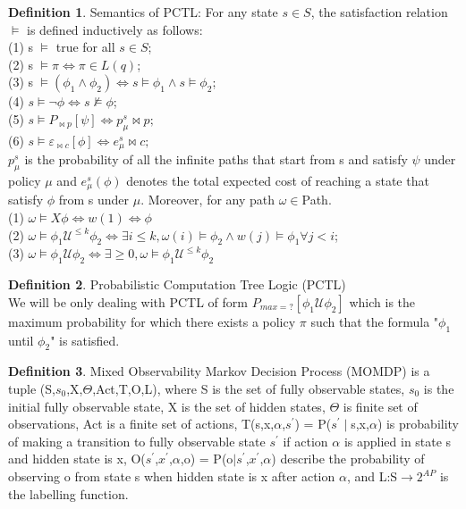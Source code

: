 \documentclass{article}
\theoremstyle{definition}
\newtheorem{definition}{Definition}[section]
\begin{document}
\begin{definition}{Semantics of PCTL:}
For any state $s \in S$, the satisfaction relation $\models$ is defined inductively as follows:\\
(1) s $\models$ true for all $s \in S$;\\
(2) s $\models \pi \Leftrightarrow \pi \in L(q)$;\\
(3) s $\models (\phi_1 \wedge \phi_2) \Leftrightarrow s \models \phi_1 \wedge s \models \phi_2$;\\
(4) $s \models \neg \phi \Leftrightarrow s \not \models \phi$;\\
(5) $s \models P_{\Join p}[\psi] \Leftrightarrow p_\mu^s \Join p;$\\
(6) $s \models \varepsilon_{\Join c}[\phi] \Leftrightarrow e_\mu^s \Join c;$\\

$p_\mu^s$ is the probability of all the infinite paths that start from s and satisfy $\psi$ under policy $\mu$ and $e_\mu^s(\phi)$ denotes the total expected cost of reaching a state that satisfy $\phi$ from s under $\mu$. Moreover, for any path $\omega \in $Path.\\
(1) $\omega \models X \phi \Leftrightarrow w(1) \Leftrightarrow \phi$\\
(2) $\omega \models \phi_1 \mathcal{U}^{\le k} \phi_2 \Leftrightarrow \exists i \le k, \omega(i) \models \phi_2 \wedge w(j) \models \phi_1 \forall j < i$;\\
(3) $\omega \models \phi_1 \mathcal{U} \phi_2 \Leftrightarrow \exists \ge 0, \omega \models \phi_1 \mathcal{U}^{\le k} \phi_2$
\end{definition}
\begin{definition}{Probabilistic Computation Tree Logic (PCTL)}\\
We will be only dealing with PCTL of form $P_{max=?}[\phi_1 \mathcal{U} \phi_2]$ which is the maximum probability for which there exists a policy $\pi$ such that the formula "$\phi_1$ until $\phi_2$" is satisfied.
\end{definition}
\begin{definition}{Mixed Observability Markov Decision Process (MOMDP)} \cite{sahil1}
is a tuple (S,$s_0$,X,$\Theta$,Act,T,O,L), where S is the set of fully observable states, $s_0$ is the initial fully observable state, X is the set of hidden states, $\Theta$ is finite set of observations, Act is a finite set of actions, T(s,x,$\alpha$,$s^{'}$) = P($s^{'}\mid$s,x,$\alpha$) is probability of making a transition to fully observable state $s^{'}$ if action $\alpha$ is applied in state s and hidden state is x, O($s^{'}$,$x^{'}$,$\alpha$,o) = P(o$\mid s^{'}$,$x^{'}$,$\alpha$) describe the probability of observing o from state s when hidden state is x after action $\alpha$, and L:S$\rightarrow 2^{AP}$ is the labelling function.
\end{definition}
\end{document}
